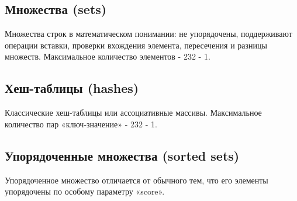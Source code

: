 \subsection{Множества (sets)}    
Множества строк в математическом понимании: не упорядочены, поддерживают операции вставки, проверки вхождения элемента, пересечения и разницы множеств. Максимальное количество элементов - 232 - 1.
\subsection{Хеш-таблицы (hashes)}    
Классические хеш-таблицы или ассоциативные массивы. Максимальное количество пар «ключ-значение» - 232 - 1.
\subsection{Упорядоченные множества (sorted sets)}
Упорядоченное множество отличается от обычного тем, что его элементы упорядочены по особому параметру «score».
